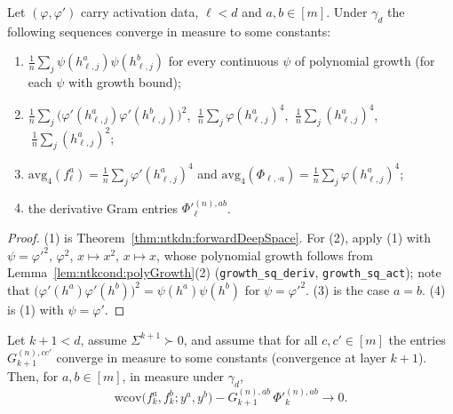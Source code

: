 \begin{lemma}\label{lem:ntkdn:tightness}
  \leanok
Let $(\varphi,\varphi')$ carry activation data, $\ell<d$ and $a,b\in[m]$. Under $\gamma_d$
the following sequences converge in measure to some constants:
\begin{enumerate}
  \item $\frac1n\sum_j\psi(h_{\ell,j}^a)\psi(h_{\ell,j}^b)$ for every continuous $\psi$ of polynomial growth (for each $\psi$ with growth bound);
  \item $\frac1n\sum_j\bigl(\varphi'(h^a_{\ell,j})\varphi'(h^b_{\ell,j})\bigr)^2$, $\ \frac1n\sum_j\varphi(h^a_{\ell,j})^4$, $\ \frac1n\sum_j(h^a_{\ell,j})^4$, $\ \frac1n\sum_j(h^a_{\ell,j})^2$;
  \item $\mathrm{avg}_4(f_\ell^a)=\frac1n\sum_j\varphi'(h^a_{\ell,j})^4$ and $\mathrm{avg}_4(\Phi_{\ell,\cdot a})=\frac1n\sum_j\varphi(h^a_{\ell,j})^4$;
  \item the derivative Gram entries $\Phi'^{(n),ab}_\ell$.
\end{enumerate}
\end{lemma}

\begin{proof}
  \leanok
(1) is Theorem~\ref{thm:ntkdn:forwardDeepSpace}. For (2), apply (1) with $\psi=\varphi'^2$, $\varphi^2$, $x\mapsto x^2$, $x\mapsto x$, whose polynomial growth follows from Lemma~\ref{lem:ntkcond:polyGrowth}(2) (\texttt{growth\_sq\_deriv}, \texttt{growth\_sq\_act}); note that $\bigl(\varphi'(h^a)\varphi'(h^b)\bigr)^2=\psi(h^a)\psi(h^b)$ for $\psi=\varphi'^2$. (3) is the case $a=b$. (4) is (1) with $\psi=\varphi'$.
\end{proof}

\begin{theorem}\label{thm:ntkdn:residualGram}
  \leanok
Let $k+1<d$, assume $\Sigma^{k+1}\succ0$, and assume that for all $c,c'\in[m]$ the entries
$G_{k+1}^{(n),cc'}$ converge in measure to some constants (convergence at layer $k+1$). Then,
for $a,b\in[m]$, in measure under $\gamma_d$,
\[
  \mathrm{wcov}\bigl(f_k^a,f_k^b;y^a,y^b\bigr)-G_{k+1}^{(n),ab}\,\Phi'^{(n),ab}_k\longrightarrow0 .
\]
\end{theorem}


